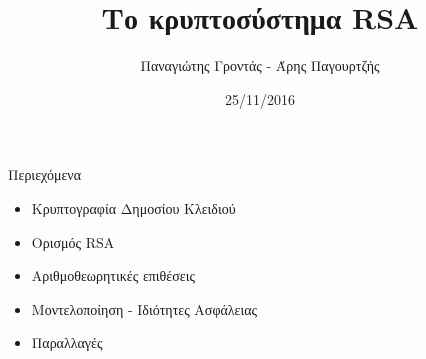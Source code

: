 \documentclass[handout]{beamer}
\title{Το κρυπτοσύστημα RSA}
\author{Παναγιώτης Γροντάς - Άρης Παγουρτζής}
\date{25/11/2016}
\institute{ΕΜΠ - Κρυπτογραφία (2016-2017)}
\begin{document}
\newcommand{\xor}{ \oplus }
\newcommand{\MSG}{ \mathtt{M} }
\newcommand{\KEY}{ \mathtt{K} }
\newcommand{\CPH}{ \mathtt{C} }
\newcommand{\keygen}{\mathtt{KeyGen}}
\newcommand{\enc}{\mathtt{Encrypt}}
\newcommand{\dec}{\mathtt{Decrypt}}
\newcommand{\adv}{$\mathcal{A} \,$ }
\newcommand{\advb}{$\mathcal{B} \,$ }
\newcommand{\chal}{$\mathcal{C} \,$ }
\newcommand{\cs}{$\mathcal{CS} \,$ }
\newcommand{\zns}{  \mathbb{Z}^*_n }
\newcommand{\zn}{  \mathbb{Z}_n }

\newcommand{\green}[1]{\textcolor{teal}{#1}}
\newcommand{\Green}[1]{\textcolor{Teal}{#1}}
\newcommand{\ForestGreen}[1]{\textcolor{ForestGreen}{#1}}
\newcommand{\blue}[1]{\textcolor{blue}{#1}}
\newcommand{\magenta}[1]{\textcolor{magenta}{#1}}
\newcommand{\cyan}[1]{\textcolor{cyan}{#1}}

\newcommand{\twopartdef}[4]
{ 
		\begin{cases}
			#1 , #2 \\
			#3 , #4
		\end{cases} 
}

\begin{frame}
\titlepage
\end{frame}


\npthousandsep{ }
\begin{frame}{Περιεχόμενα}
\begin{itemize}
\item Κρυπτογραφία Δημοσίου Κλειδιού
\pause
\item Ορισμός RSA
\pause
\item Αριθμοθεωρητικές επιθέσεις
\pause
\item Μοντελοποίηση - Ιδιότητες Ασφάλειας
\pause
\item Παραλλαγές
\end{itemize}
\end{frame}
\end{document}
